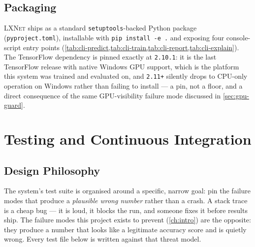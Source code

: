 \documentclass[11pt,a4paper,oneside]{report}
\newcommand{\LXNet}{\textsc{LXNet}}
\newcommand{\code}[1]{\texttt{\small #1}}
\begin{document}
\section{Packaging}

\LXNet{} ships as a standard \code{setuptools}-backed Python package
(\texttt{pyproject.toml}), installable with \code{pip install -e .} and
exposing four console-script entry points
(\cref{tab:cli-predict,tab:cli-train,tab:cli-report,tab:cli-explain}). The
TensorFlow dependency is pinned exactly at \code{2.10.1}: it is the last
TensorFlow release with native Windows GPU support, which is the platform
this system was trained and evaluated on, and \code{2.11+} silently drops to
CPU-only operation on Windows rather than failing to install --- a pin, not a
floor, and a direct consequence of the same GPU-visibility failure mode
discussed in \cref{sec:gpu-guard}.

\chapter{Testing and Continuous Integration}
\label{ch:testing}

\section{Design Philosophy}

The system's test suite is organised around a specific, narrow goal: pin the
failure modes that produce a \emph{plausible wrong number} rather than a
crash. A stack trace is a cheap bug --- it is loud, it blocks the run, and
someone fixes it before results ship. The failure modes this project exists
to prevent (\cref{ch:intro}) are the opposite: they produce a number that
looks like a legitimate accuracy score and is quietly wrong. Every test file
below is written against that threat model.
\end{document}
